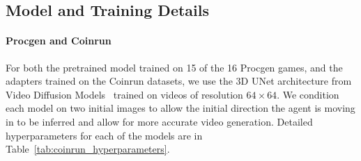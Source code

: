 \subsection{Model and Training Details}
\label{sec:model_details}

\paragraph{Procgen and Coinrun} For both the pretrained model trained on 15 of the 16 Procgen games, and the adapters trained on the Coinrun datasets, we use the 3D UNet architecture from Video Diffusion Models~\citep{ho2022video} trained on videos of resolution $64 \times 64$. We condition each model on two initial images to allow the initial direction the agent is moving in to be inferred and allow for more accurate video generation. Detailed hyperparameters for each of the models are in Table~\ref{tab:coinrun_hyperparameters}.

